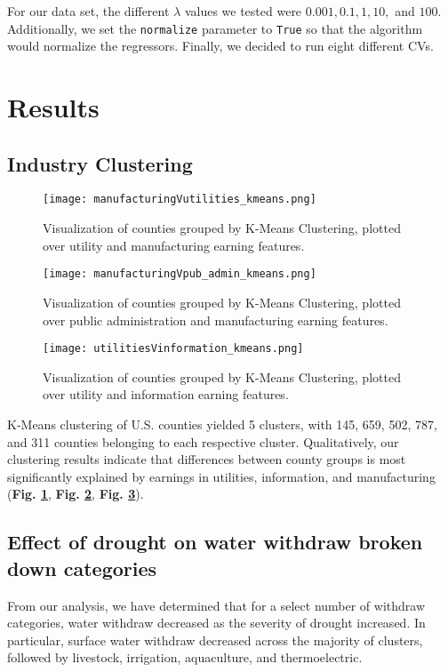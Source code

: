 \documentclass{article}
\begin{document}
For our data set, the different $\lambda$ values we tested were $0.001, 0.1, 1, 10,$ and $100$. Additionally, we set the \texttt{normalize} parameter to \texttt{True} so that the algorithm would normalize the regressors. Finally, we decided to run eight different CVs.

\section{Results} 
\subsection{Industry Clustering}

\begin{figure}[hbt!]
    \centering
    \texttt{[image: manufacturingVutilities\_kmeans.png]}
    \caption{Visualization of counties grouped by K-Means Clustering, plotted over utility and manufacturing earning features.}
    \label{fig:cluster1}
\end{figure}
\begin{figure}[hbt!]
    \centering
    \texttt{[image: manufacturingVpub\_admin\_kmeans.png]}
    \caption{Visualization of counties grouped by K-Means Clustering, plotted over public administration and manufacturing earning features.}
    \label{fig:cluster2}
\end{figure}
\begin{figure}[hbt!]
    \centering
    \texttt{[image: utilitiesVinformation\_kmeans.png]}
    \caption{Visualization of counties grouped by K-Means Clustering, plotted over utility and information earning features.}
    \label{fig:cluster3}
\end{figure}
K-Means clustering of U.S. counties yielded 5 clusters, 
with 145, 659, 502, 787, and 311 counties belonging to each respective cluster. Qualitatively, our clustering results indicate
that differences between county groups is most significantly explained by earnings in utilities, information, and manufacturing (\textbf{Fig. \ref{fig:cluster1}}, \textbf{Fig. \ref{fig:cluster2}}, \textbf{Fig. \ref{fig:cluster3}}).


\subsection{Effect of drought on water withdraw broken down categories}
From our analysis, we have determined that for a select number of withdraw categories, water withdraw  
decreased as the severity of drought increased. In particular, 
surface water withdraw decreased across the majority of clusters, followed by livestock, irrigation, aquaculture, and thermoelectric. 
\end{document}
